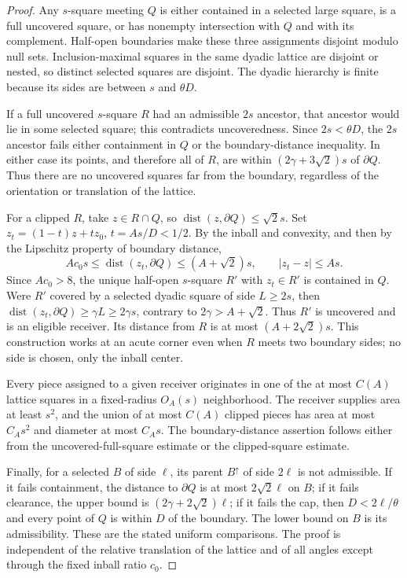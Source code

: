 \documentclass[11pt]{article}
\theoremstyle{definition}
\theoremstyle{remark}
\numberwithin{equation}{section}
\newcommand{\dist}{\operatorname{dist}}
\begin{document}
\begin{proof}
Any $s$-square meeting $Q$ is either contained in a selected
large square, is a full uncovered square, or has nonempty
intersection with $Q$ and with its complement.  Half-open
boundaries make these three assignments disjoint modulo null
sets.  Inclusion-maximal squares in the same dyadic lattice
are disjoint or nested, so distinct selected squares are
disjoint.  The dyadic hierarchy is finite because its sides
are between $s$ and $\theta D$.

If a full uncovered $s$-square $R$ had an admissible $2s$
ancestor, that ancestor would lie in some selected square;
this contradicts uncoveredness.  Since $2s<\theta D$,
the $2s$ ancestor fails either containment in $Q$ or the
boundary-distance inequality.  In either case its points,
and therefore all of $R$, are within
$(2\gamma+3\sqrt2)s$ of $\partial Q$.  Thus there are no
uncovered squares far from the boundary, regardless of the
orientation or translation of the lattice.

For a clipped $R$, take $z\in R\cap Q$, so
$\dist(z,\partial Q)\le\sqrt2s$.  Set
$z_t=(1-t)z+tz_0$, $t=As/D<1/2$.  By the inball and
convexity, and then by the Lipschitz property of boundary
distance,
\[
 Ac_0s\le\dist(z_t,\partial Q)
 \le(A+\sqrt2)s,\qquad |z_t-z|\le As.
\]
Since $Ac_0>8$, the unique half-open $s$-square $R'$ with
$z_t\in R'$ is contained in $Q$.  Were $R'$ covered by a
selected dyadic square of side $L\ge2s$, then
$\dist(z_t,\partial Q)\ge\gamma L\ge2\gamma s$,
contrary to $2\gamma>A+\sqrt2$.  Thus $R'$ is uncovered
and is an eligible receiver.  Its distance from $R$ is at
most $(A+2\sqrt2)s$.  This construction works at an acute
corner even when $R$ meets two boundary sides; no side is
chosen, only the inball center.

Every piece assigned to a given receiver originates in one
of the at most $C(A)$ lattice squares in a fixed-radius
$O_A(s)$ neighborhood.  The receiver supplies area at least
$s^2$, and the union of at most $C(A)$ clipped pieces has
area at most $C_A s^2$ and diameter at most $C_A s$.
The boundary-distance assertion follows either from the
uncovered-full-square estimate or the clipped-square estimate.

Finally, for a selected $B$ of side $\ell$, its parent $B^\uparrow$
of side $2\ell$ is not admissible.  If it fails containment,
the distance to $\partial Q$ is at most $2\sqrt2\ell$ on $B$;
if it fails clearance, the upper bound is
$(2\gamma+2\sqrt2)\ell$; if it fails the cap, then
$D<2\ell/\theta$ and every point of $Q$ is within $D$
of the boundary.  The lower bound on $B$ is its
admissibility.  These are the stated uniform comparisons.
The proof is independent of the relative translation of the
lattice and of all angles except through the fixed inball
ratio $c_0$.
\end{proof}
\end{document}

